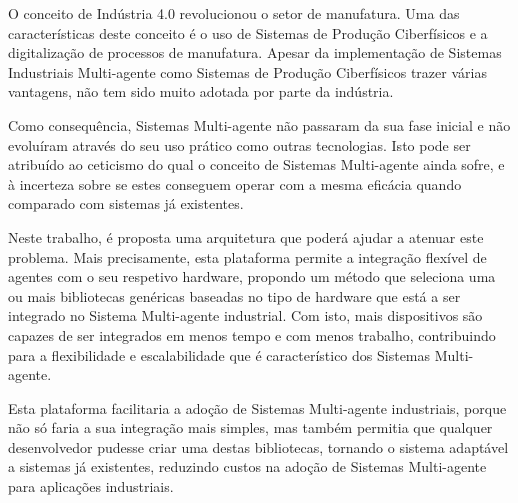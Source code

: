 
%

O conceito de Indústria 4.0 revolucionou o setor de manufatura. Uma das características deste conceito é o uso de Sistemas de Produção Ciberfísicos e a digitalização de processos de manufatura. Apesar da implementação de Sistemas Industriais Multi-agente como Sistemas de Produção Ciberfísicos trazer várias vantagens, não tem sido muito adotada por parte da indústria.

Como consequência, Sistemas Multi-agente não passaram da sua fase inicial e não evoluíram através do seu uso prático como outras tecnologias. Isto pode ser atribuído ao ceticismo do qual o conceito de Sistemas Multi-agente ainda sofre, e à incerteza sobre se estes conseguem operar com a mesma eficácia quando comparado com sistemas já existentes.

Neste trabalho, é proposta uma arquitetura que poderá ajudar a atenuar este problema. Mais precisamente, esta plataforma permite a integração flexível de agentes com o seu respetivo hardware, propondo um método que seleciona uma ou mais bibliotecas genéricas baseadas no tipo de hardware que está a ser integrado no Sistema Multi-agente industrial. Com isto, mais dispositivos são capazes de ser integrados em menos tempo e com menos trabalho, contribuindo para a flexibilidade e escalabilidade que é característico dos Sistemas Multi-agente.

Esta plataforma facilitaria a adoção de Sistemas Multi-agente industriais, porque não só faria a sua integração mais simples, mas também permitia que qualquer desenvolvedor pudesse criar uma destas bibliotecas, tornando o sistema adaptável a sistemas já existentes, reduzindo custos na adoção de Sistemas Multi-agente para aplicações industriais.

%
%

